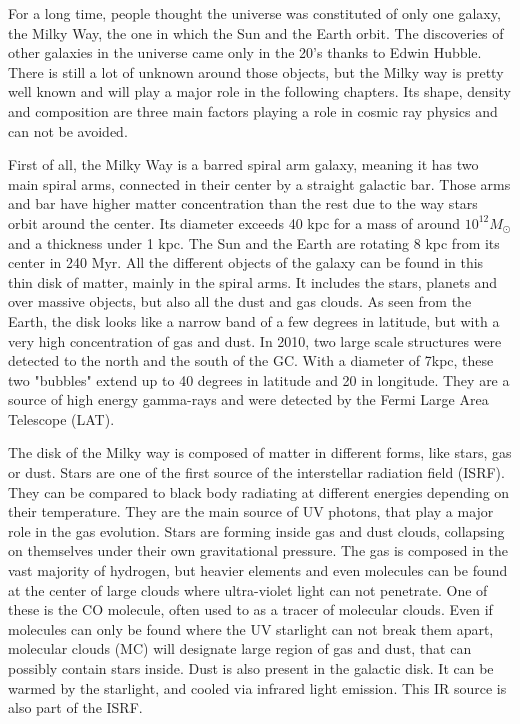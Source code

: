 For a long time, people thought the universe was constituted of only one galaxy, the Milky Way, the one in which the Sun and the Earth orbit. The discoveries of other galaxies in the universe came only in the 20's thanks to Edwin Hubble. There is still a lot of unknown  around those objects, but the Milky way is pretty well known and will play a major role in the following chapters. Its shape, density and composition are three main factors playing a role in cosmic ray physics and can not be avoided.

First of all, the Milky Way is a barred spiral arm galaxy, meaning it has two main spiral arms, connected in their center by a straight galactic bar. Those arms and bar have higher matter concentration than the rest due to the way stars orbit around the center. Its diameter exceeds 40 kpc for a mass of around $10^{12} M_\odot$ and a thickness under 1 kpc. The Sun and the Earth are rotating 8 kpc from its center in 240 Myr.
All the different objects of the galaxy can be found in this thin disk of matter, mainly in the spiral arms. It includes the stars, planets and over massive objects, but also all the dust and gas clouds. As seen from the Earth, the disk looks like a narrow band of a few degrees in latitude, but with a very high concentration of gas and dust.
In 2010, two large scale structures were detected to the north and the south of the GC. With a diameter of 7kpc, these two "bubbles" extend up to 40 degrees in latitude and 20 in longitude. They are a source of high energy gamma-rays and were detected by the Fermi Large Area Telescope (LAT).

The disk of the Milky way is composed of matter in different forms, like stars, gas or dust. Stars are one of the first source of the interstellar radiation field (ISRF). They can be compared to black body radiating at different energies depending on their temperature. They are the main source of UV photons, that play a major role in the gas evolution. Stars are forming inside gas and dust clouds, collapsing on themselves under their own gravitational pressure.
The gas is composed in the vast majority of hydrogen, but heavier elements and even molecules can be found at the center of large clouds where ultra-violet light can not penetrate. One of these is the CO molecule, often used to as a tracer of molecular clouds. Even if molecules can only be found where the UV starlight can not break them apart, molecular clouds (MC) will designate large region of gas and dust, that can possibly contain stars inside.
 Dust is also present in the galactic disk. It can be warmed by the starlight, and cooled via infrared light emission. This IR source is also part of the ISRF.

